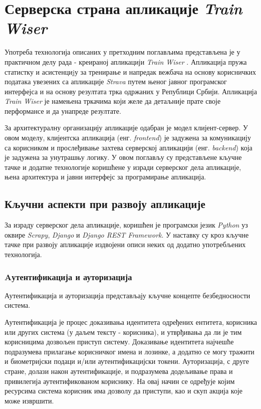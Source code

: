 \documentclass[12pt,oneside]{memoir}
\begin{document}
\chapter{Серверска страна апликације \textit{Train Wiser}}\label{chapter:impl-server-app}

Употреба технологија описаних у претходним поглављима представљена је у практичном делу рада - креираној апликацији \textit{Train Wiser} \cite{train_wiser_implementation}. Апликација пружа статистку и асистенциjу за тренирање и напредак вежбача на основу корисничких података увезених са апликације \textit{Strava} путем њеног јавног програмског интерфејса и на основу резултата трка одржаних у Републици Србији. 
Апликација \textit{Train Wiser} је намењена тркачима који желе да детаљније прате своје перформансе и да унапреде резултате.

За архитектуралну организацију апликације одабран је модел клијент-сервер. У овом моделу, клијентска апликација (енг. \textit{frontend}) је задужена за комуникацију са корисником и прослеђивање захтева серверској апликацији (енг. \textit{backend}) која је задужена за унутрашњу логику. У овом поглављу су представљене кључне тачке и додатне технологије коришћене у изради серверског дела апликације, њена архитектура и јавни интерфејс за програмирање апликација.


\section{Кључни аспекти при развоју апликације}

За израду серверског дела апликације, коришћен је програмски језик \textit{Python} уз оквире \textit{Scrapy},
\textit{Django} и \textit{Django REST Framework}. У наставку су кроз кључне тачке при развоју апликације издвојени описи неких од додатно употребљених технологија.

\subsection{Aутентификација и ауторизација} \label{subsec:authorization_and_authentication}

Аутентификација и ауторизација представљају кључне концепте безбедносности система.

Аутентификација је процес доказивања идентитета одређених ентитета, корисника или других система (у даљем тексту - корисника), и утврђивања да ли је тим корисницима дозвољен приступ систему. Доказивање идентитета најчешће подразумева прилагање корисничког имена и лозинке, а додатно се могу тражити и биометријски подаци и/или аутентификацијски токени.
Ауторизација, с друге стране, долази након аутентификације, и подразумева додељивање права и привилегија аутентификованом кориснику. На овај начин се одређује којим ресурсима система корисник има дозволу да приступи, као и скуп акција које може извршити. 
\end{document}
